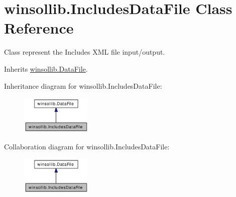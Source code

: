 \hypertarget{classwinsollib_1_1IncludesDataFile}{
\section{winsollib.Includes\-Data\-File Class Reference}
\label{classwinsollib_1_1IncludesDataFile}
}
Class represent the Includes XML file input/output.  


Inherits \hyperlink{classwinsollib_1_1DataFile}{winsollib.Data\-File}.

Inheritance diagram for winsollib.Includes\-Data\-File:\begin{figure}[H]
\begin{center}
\leavevmode
\includegraphics[width=95pt]{classwinsollib_1_1IncludesDataFile__inherit__graph}
\end{center}
\end{figure}
Collaboration diagram for winsollib.Includes\-Data\-File:\begin{figure}[H]
\begin{center}
\leavevmode
\includegraphics[width=95pt]{classwinsollib_1_1IncludesDataFile__coll__graph}
\end{center}
\end{figure}
